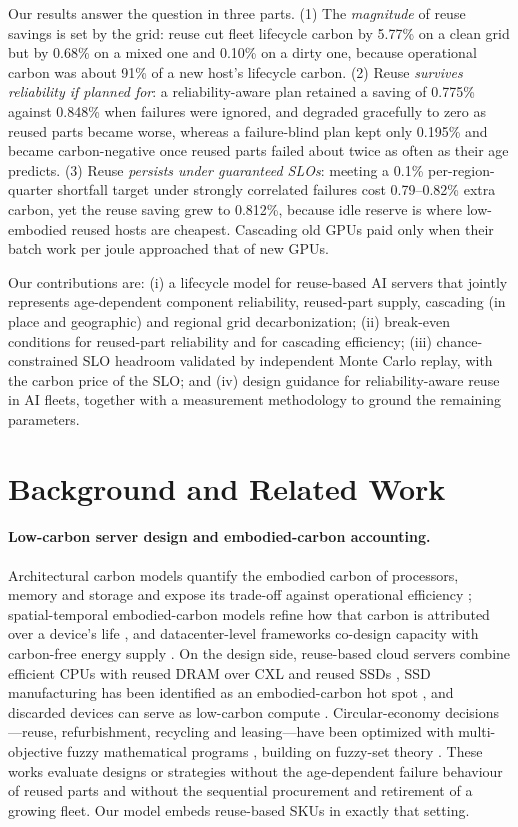 \documentclass[11pt]{article}
\begin{document}
Our results answer the question in three parts. (1) The \emph{magnitude} of reuse savings is set by the grid: reuse cut fleet lifecycle carbon by 5.77\% on a clean grid but by 0.68\% on a mixed one and 0.10\% on a dirty one, because operational carbon was about 91\% of a new host's lifecycle carbon. (2) Reuse \emph{survives reliability if planned for}: a reliability-aware plan retained a saving of 0.775\% against 0.848\% when failures were ignored, and degraded gracefully to zero as reused parts became worse, whereas a failure-blind plan kept only 0.195\% and became carbon-negative once reused parts failed about twice as often as their age predicts. (3) Reuse \emph{persists under guaranteed SLOs}: meeting a 0.1\% per-region-quarter shortfall target under strongly correlated failures cost 0.79--0.82\% extra carbon, yet the reuse saving grew to 0.812\%, because idle reserve is where low-embodied reused hosts are cheapest. Cascading old GPUs paid only when their batch work per joule approached that of new GPUs.

Our contributions are: (i) a lifecycle model for reuse-based AI servers that jointly represents age-dependent component reliability, reused-part supply, cascading (in place and geographic) and regional grid decarbonization; (ii) break-even conditions for reused-part reliability and for cascading efficiency; (iii) chance-constrained SLO headroom validated by independent Monte Carlo replay, with the carbon price of the SLO; and (iv) design guidance for reliability-aware reuse in AI fleets, together with a measurement methodology to ground the remaining parameters.

\section{Background and Related Work}
\paragraph{Low-carbon server design and embodied-carbon accounting.}
Architectural carbon models quantify the embodied carbon of processors, memory and storage and expose its trade-off against operational efficiency \citep{gupta2022act,gupta2022chasing}; spatial-temporal embodied-carbon models refine how that carbon is attributed over a device's life \citep{zhang2024spatialembodied}, and datacenter-level frameworks co-design capacity with carbon-free energy supply \citep{acun2023carbonexplorer}. On the design side, reuse-based cloud servers combine efficient CPUs with reused DRAM over CXL and reused SSDs \citep{wang2024greensku}, SSD manufacturing has been identified as an embodied-carbon hot spot \citep{tannu2023ssd}, and discarded devices can serve as low-carbon compute \citep{switzer2023junkyard}. Circular-economy decisions---reuse, refurbishment, recycling and leasing---have been optimized with multi-objective fuzzy mathematical programs \citep{poonia2024circular}, building on fuzzy-set theory \citep{zadeh1965fuzzy}. These works evaluate designs or strategies without the age-dependent failure behaviour of reused parts and without the sequential procurement and retirement of a growing fleet. Our model embeds reuse-based SKUs in exactly that setting.
\end{document}

